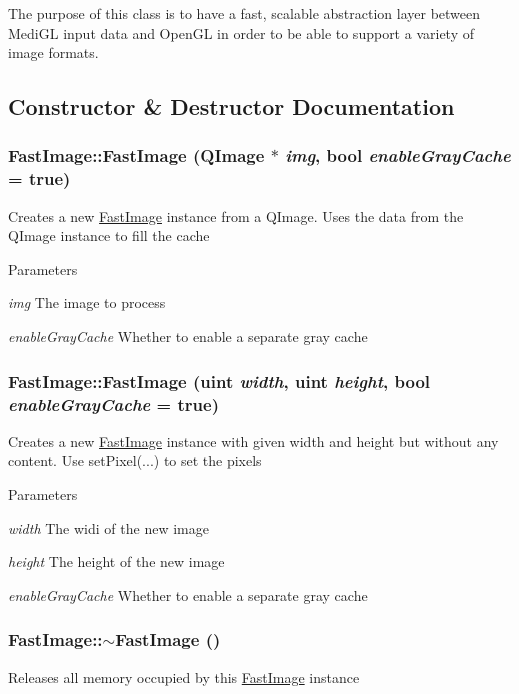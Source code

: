 The purpose of this class is to have a fast, scalable abstraction layer between MediGL input data and OpenGL in order to be able to support a variety of image formats. 

\subsection{Constructor \& Destructor Documentation}
\hypertarget{class_fast_image_a1ee91a3ac8ddcdfed90e9906bb3f0681}{
\subsubsection[{FastImage}]{\setlength{\rightskip}{0pt plus 5cm}FastImage::FastImage (QImage $\ast$ {\em img}, \/  bool {\em enableGrayCache} = {\ttfamily true})}}
\label{class_fast_image_a1ee91a3ac8ddcdfed90e9906bb3f0681}
Creates a new \hyperlink{class_fast_image}{FastImage} instance from a QImage. Uses the data from the QImage instance to fill the cache 
\begin{DoxyParams}{Parameters}
\item[{\em img}]The image to process \item[{\em enableGrayCache}]Whether to enable a separate gray cache \end{DoxyParams}
\hypertarget{class_fast_image_ab9530428f52635d4f87d9b1cc33e10cd}{
\subsubsection[{FastImage}]{\setlength{\rightskip}{0pt plus 5cm}FastImage::FastImage (uint {\em width}, \/  uint {\em height}, \/  bool {\em enableGrayCache} = {\ttfamily true})}}
\label{class_fast_image_ab9530428f52635d4f87d9b1cc33e10cd}
Creates a new \hyperlink{class_fast_image}{FastImage} instance with given width and height but without any content. Use setPixel(...) to set the pixels 
\begin{DoxyParams}{Parameters}
\item[{\em width}]The widi of the new image \item[{\em height}]The height of the new image \item[{\em enableGrayCache}]Whether to enable a separate gray cache \end{DoxyParams}
\hypertarget{class_fast_image_ae2937f18d549ffc788abaa1a5bf6f492}{
\subsubsection[{$\sim$FastImage}]{\setlength{\rightskip}{0pt plus 5cm}FastImage::$\sim$FastImage ()}}
\label{class_fast_image_ae2937f18d549ffc788abaa1a5bf6f492}
Releases all memory occupied by this \hyperlink{class_fast_image}{FastImage} instance 

